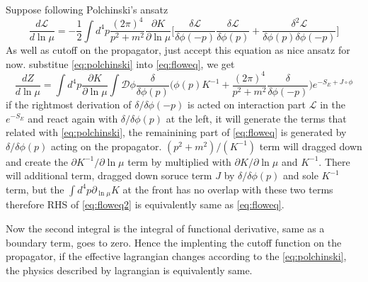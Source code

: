 \documentclass[12pt,halfline,a4paper]{ouparticle}
\begin{document}
Suppose following Polchinski's ansatz
\begin{equation}
	\label{eq:polchinski}
	\frac{d\mathcal L}{d\ln\mu}=-\frac{1}{2}\int d^4p\frac{(2\pi)^4}{p^2+m^2}\frac{\partial K}{\partial \ln\mu}\bigg[\frac{\delta \mathcal L}{\delta \phi(-p)}\frac{\delta \mathcal L}{\delta \phi(p)}+\frac{\delta^2 \mathcal L}{\delta \phi(p)\delta \phi(-p)}\bigg]
\end{equation}
As well as cutoff on the propagator, just accept this equation as nice ansatz for now. substitue \ref{eq:polchinski} into \ref{eq:floweq}, we get
\begin{equation}
	\label{eq:floweq2}
	\frac{dZ}{d\ln \mu} = \int d^4p \frac{\partial K}{\partial\ln \mu}\int \mathcal D \phi\frac{\delta}{\delta \phi(p)}\bigg(\phi(p)K^{-1}+\frac{(2\pi)^4}{p^2+m^2}\frac{\delta}{\delta\phi(-p)}\bigg)e^{-S_E+J\circ\phi}
\end{equation}
if the rightmost derivation of $\delta/\delta\phi(-p)$ is acted on interaction part $\mathcal L$ in the $e^{-S_E}$ and react again with $\delta/\delta\phi(p)$ at the left, it will generate the terms that related with \ref{eq:polchinski},
the remainining part of \ref{eq:floweq} is generated by $\delta/\delta\phi(p)$ acting on the propagator. $(p^2+m^2)/(K^{-1})$ term will dragged down and create the $\partial K^{-1}/\partial \ln \mu$ term by multiplied with $\partial K/\partial \ln \mu$ and $K^{-1}$.
There will additional term, dragged down soruce term $J$ by $\delta/\delta\phi(p)$ and sole $K^{-1}$ term, but the $\int d^4p \partial_{\ln \mu} K$ at the front has no overlap with these two terms therefore RHS of \ref{eq:floweq2} is equivalently same as \ref{eq:floweq}.

Now the second integral is the integral of functional derivative, same as a boundary term, goes to zero. Hence the implenting the cutoff function on the propagator, if the effective lagrangian changes according to the \ref{eq:polchinski}, the physics described by lagrangian is equivalently same.
\end{document}
